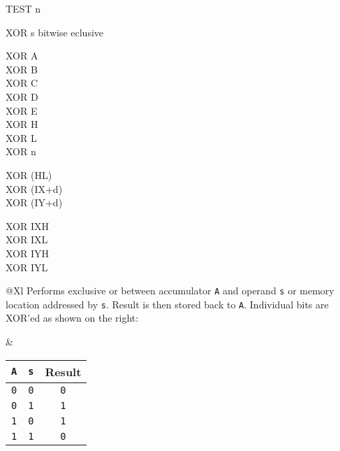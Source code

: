 \begin{basedescript}{
	\desclabelstyle{\multilinelabel}
	\desclabelwidth{3cm}}
\begin{DetailItem}{TEST n\ZXN}
	\end{DetailItem}

	\pagebreak
	\begin{DetailItem}{XOR s}
		{bitwise eclusive }
		{}

		\begin{DetailVariants}
			XOR A\\
			XOR B\\
			XOR C\\
			XOR D\\
			XOR E\\
			XOR H\\
			XOR L\\
			XOR n

			\columnbreak
			XOR (HL)\\
			XOR (IX+d)\\
			XOR (IY+d)

			\columnbreak
			XOR IXH\UNDOC\\
			XOR IXL\UNDOC\\
			XOR IYH\UNDOC\\
			XOR IYL\UNDOC
		\end{DetailVariants}
		
		\begin{tabularx}{\linewidth}{@{}Xl}
			Performs exclusive or between accumulator {\tt A} and operand {\tt s} or memory location addressed by {\tt s}. Result is then stored back to {\tt A}. Individual bits are XOR'ed as shown on the right:
	
			&

			\begin{tabular}[t]{cc|c}
				{\tt A} & {\tt s} & Result \\
				\hline
				{\tt 0} & {\tt 0} & {\tt 0} \\
				{\tt 0} & {\tt 1} & {\tt 1} \\
				{\tt 1} & {\tt 0} & {\tt 1} \\
				{\tt 1} & {\tt 1} & {\tt 0} \\
			\end{tabular}

			\\
		\end{tabularx}

		\begin{DetailEffects}[p]
			\FlagsXORr
		\end{DetailEffects}
						
		\begin{DetailTiming}
		\end{DetailTiming}

	\end{DetailItem}

\end{basedescript}


\pagebreak
\IntentionallyEmpty
\pagebreak
